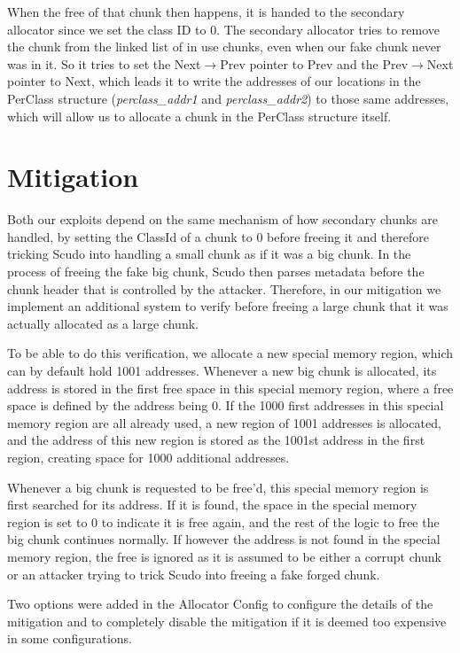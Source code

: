 \documentclass[a4paper,11pt,oneside]{report}
\begin{document}
When the free of that chunk then happens, it is handed to the secondary allocator since we
set the class ID to 0. The secondary allocator tries to remove the chunk from the linked
list of in use chunks, even when our fake chunk never was in it. So it tries to set the
Next$\rightarrow$Prev pointer to Prev and the Prev$\rightarrow$Next pointer to Next, which
leads it to write the addresses of our locations in the PerClass structure
(\emph{perclass\_addr1} and \emph{perclass\_addr2}) to those same addresses, which will
allow us to allocate a chunk in the PerClass structure itself.

\chapter{Mitigation}

Both our exploits depend on the same mechanism of how secondary chunks are handled, by setting
the ClassId of a chunk to 0 before freeing it and therefore tricking Scudo into handling a
small chunk as if it was a big chunk. In the process of freeing the fake big chunk, Scudo
then parses metadata before the chunk header that is controlled by the attacker.
Therefore, in our mitigation we implement an additional system to verify before freeing a
large chunk that it was actually allocated as a large chunk.

To be able to do this verification, we allocate a new special memory region, which can by
default hold 1001 addresses. Whenever a new big chunk is allocated, its address is stored
in the first free space in this special memory region, where a free space is defined by
the address being 0. If the 1000 first addresses in this special memory region are all
already used, a new region of 1001 addresses is allocated, and the address of this new
region is stored as the 1001st address in the first region, creating space for 1000
additional addresses. 

Whenever a big chunk is requested to be free'd, this special memory region is first
searched for its address. If it is found, the space in the special memory region is set to
0 to indicate it is free again, and the rest of the logic to free the big chunk continues
normally. If however the address is not found in the special memory region, the free is
ignored as it is assumed to be either a corrupt chunk or an attacker trying to trick Scudo
into freeing a fake forged chunk.

Two options were added in the Allocator Config to configure the details of the mitigation
and to completely disable the mitigation if it is deemed too expensive in some
configurations.
\end{document}
